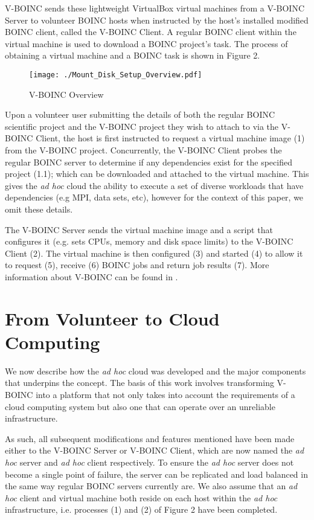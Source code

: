 \documentclass[10pt, conference, compsocconf]{IEEEtran}
\begin{document}
V-BOINC sends these lightweight VirtualBox virtual machines from a V-BOINC Server to volunteer BOINC hosts when instructed by the host's installed modified BOINC client, called the V-BOINC Client. A regular BOINC client within the virtual machine is used to download a BOINC project's task. The process of obtaining a virtual machine and a BOINC task is shown in Figure 2.

\begin{figure}[h!]
  \begin{center}
\texttt{[image: ./Mount\_Disk\_Setup\_Overview.pdf]}
  \end{center}
 \caption{V-BOINC Overview}
\end{figure}

Upon a volunteer user submitting the details of both the regular BOINC scientific project and the V-BOINC project they wish to attach to via the V-BOINC Client, the host is first instructed to request a virtual machine image (1) from the V-BOINC project. Concurrently, the V-BOINC Client probes the regular BOINC server to determine if any dependencies exist for the specified project (1.1); which can be downloaded and attached to the virtual machine. This gives the \textit{ad hoc} cloud the ability to execute a set of diverse workloads that have dependencies (e.g MPI, data sets, etc), however for the context of this paper, we omit these details.

The V-BOINC Server sends the virtual machine image and a script that configures it (e.g. sets CPUs, memory and disk space limits) to the V-BOINC Client (2). The virtual machine is then configured (3) and started (4) to allow it to request (5), receive (6) BOINC jobs and return job results (7). More information about V-BOINC can be found in \cite{McGilvary2013}.

\section{From Volunteer to Cloud Computing}
We now describe how the \textit{ad hoc} cloud was developed and the major components that underpins the concept. The basis of this work involves transforming V-BOINC into a platform that not only takes into account the requirements of a cloud computing system but also one that can operate over an unreliable infrastructure. 

As such, all subsequent modifications and features mentioned have been made either to the V-BOINC Server or V-BOINC Client, which are now named the \textit{ad hoc} server and \textit{ad hoc} client respectively. To ensure the \textit{ad hoc} server does not become a single point of failure, the server can be replicated and load balanced in the same way regular BOINC servers currently are. We also assume that an \textit{ad hoc} client and virtual machine both reside on each host within the \textit{ad hoc} infrastructure, i.e. processes (1) and (2) of Figure 2 have been completed.
\end{document}
